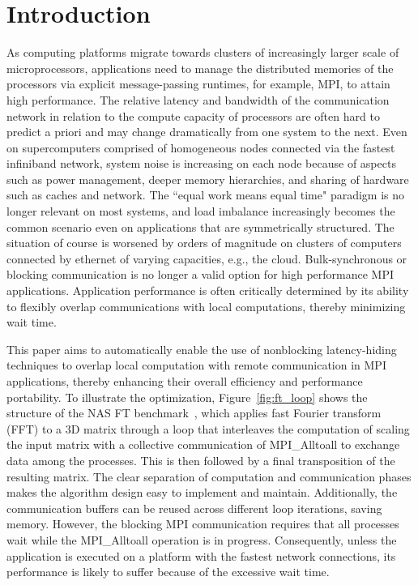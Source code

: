 \section{Introduction}
\label{sec:intro}

As computing platforms migrate towards clusters of increasingly larger scale of microprocessors,
 applications need to manage the distributed memories of the processors via explicit
message-passing runtimes, for example, MPI, to attain high performance.
The relative latency and bandwidth of the communication network in relation to the compute capacity of processors
are often hard to predict a priori and may change dramatically from one system to the next.
Even on supercomputers comprised of homogeneous nodes connected via the fastest infiniband network,
system noise is increasing on each node because of aspects such as power management, deeper memory hierarchies, and sharing of hardware such as caches and network. The ``equal work means equal time" paradigm is no longer relevant on most systems, and load imbalance increasingly becomes the common scenario even on applications that are symmetrically structured.
The situation of course is worsened by orders of magnitude on clusters of computers connected by ethernet of varying capacities, e.g., the cloud. Bulk-synchronous or blocking communication is no longer a valid option for high performance MPI applications.
Application performance is often critically determined by its ability to flexibly overlap communications with local computations,
thereby minimizing wait time.


This paper aims to automatically enable the use of nonblocking latency-hiding techniques to overlap local computation with remote communication in MPI applications, thereby enhancing their overall efficiency and performance portability.
To illustrate the optimization, Figure~\ref{fig:ft_loop} shows the
structure of the NAS FT benchmark~\cite{npb}, which applies fast
Fourier transform (FFT) to a 3D matrix through a loop that interleaves
the computation of scaling the input matrix with a collective
communication of MPI\_Alltoall to exchange data among the
processes. This is then followed by a final transposition of the
resulting matrix.  The clear separation of computation and
communication phases makes the algorithm design easy to implement and
maintain.  Additionally, the communication buffers can be reused
across different loop iterations, saving memory.  However, the
blocking MPI communication requires that all processes wait while the
MPI\_Alltoall operation is in progress.  Consequently, unless the
application is executed on a platform with the fastest network
connections, its performance is likely to suffer because of the
excessive wait time.

